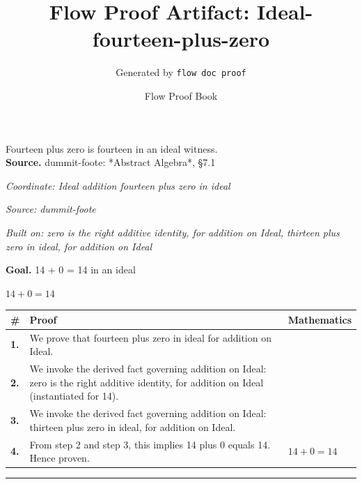 \documentclass[11pt]{article}
\title{Flow Proof Artifact: Ideal-fourteen-plus-zero}
\author{Generated by \texttt{flow doc proof}}
\date{Flow Proof Book}
\theoremstyle{definition}
\begin{document}
\maketitle
Fourteen plus zero is fourteen in an ideal witness.\\[0.5em]
\textbf{Source.} dummit-foote: *Abstract Algebra*, §7.1\\[0.5em]
\bigskip
{}\par
\smallskip\noindent\textit{Coordinate: Ideal \cdot addition \cdot fourteen plus zero in ideal}\par
\smallskip\noindent\textit{Source: dummit-foote}\par
\smallskip\noindent\textit{Built on: zero is the right additive identity, for addition on Ideal, thirteen plus zero in ideal, for addition on Ideal}\par
\medskip
\noindent\textbf{Goal.} 14 + 0 = 14 in an ideal\par
\noindent$\displaystyle 14 + 0 = 14$\par
\medskip
\noindent
\begin{tabular}{@{} >{\raggedright\arraybackslash}p{} >{\raggedright\arraybackslash}p{} >{\raggedleft\arraybackslash}p{} @{}}
\textbf{\#} & \textbf{Proof} & \textbf{Mathematics} \\
\midrule
\textbf{1.} & We prove that fourteen plus zero in ideal for addition on Ideal. & \\[0.45em]
\textbf{2.} & We invoke the derived fact governing addition on Ideal: zero is the right additive identity, for addition on Ideal (instantiated for 14). & \\[0.45em]
\textbf{3.} & We invoke the derived fact governing addition on Ideal: thirteen plus zero in ideal, for addition on Ideal. & \\[0.45em]
\textbf{4.} & From step 2 and step 3, this implies 14 plus 0 equals 14. Hence proven. & $\displaystyle 14 + 0 = 14$ \\[0.45em]
\bottomrule
\end{tabular}
\label{thm:Ideal-addition-fourteen_plus_zero_in_ideal}
\par\medskip\hrule
\end{document}
